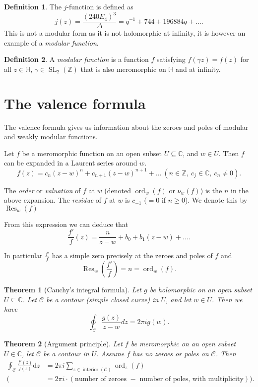 \documentclass{article}
\newtheorem*{thm}{Theorem}
\theoremstyle{definition}
\newtheorem*{defn}{Definition}
\DeclareMathOperator{\SL}{SL}
\DeclareMathOperator{\res}{Res}
\DeclareMathOperator{\ord}{ord}
\begin{document}
\begin{defn}
The $j$-function is defined as
\[j(z) = \frac{(240E_4)^3}{\Delta} = q^{-1} + 744 +196884q + \ldots.\]
This is not a modular form as it is not holomorphic at infinity, it is however an example of a \emph{modular function}.
\end{defn}

\begin{defn}
A \emph{modular function} is a function $f$ satisfying $f(\gamma z) = f(z)$ for all $z\in\mathbb{H}$, $\gamma\in\SL_2(\mathbb{Z})$ that is also meromorphic on $\mathbb{H}$ and at infinity.
\end{defn}

\section{The valence formula}

The valence formula gives us information about the zeroes and poles of modular and weakly modular functions.

Let $f$ be a meromorphic function on an open subset $U\subseteq\mathbb{C}$, and $w\in U$.
Then $f$ can be expanded in a Laurent series around $w$.
\[f(z) = c_n(z-w)^n + c_{n+1}(z-w)^{n+1} + \ldots\ (n\in\mathbb{Z},\ c_j\in\mathbb{C},\ c_n\ne 0).\]

The \emph{order} or \emph{valuation} of $f$ at $w$ (denoted $\ord_w(f)$ or $\nu_w(f)$) is the $n$ in the above expansion.
The \emph{residue} of $f$ at $w$ is $c_{-1}$ ($ = 0$ if $n\ge 0$).
We denote this by $\res_w(f)$

From this expression we can deduce that
\[\frac{f'}{f}(z) = \frac{n}{z-w} + b_0 + b_1(z-w) + \ldots.\]

In particular $\frac{f'}{f}$ has a simple zero precisely at the zeroes and poles of $f$ and
\[\res_w\left(\frac{f'}{f}\right) = n = \ord_w(f).\]

\begin{thm}[Cauchy's integral formula] Let $g$ be holomorphic on an open subset $U\subseteq\mathbb{C}$.
Let $\mathcal{C}$ be a contour (simple closed curve) in $U$, and let $w\in U$.
Then we have
\[\oint_{\mathcal{C}} \frac{g(z)}{z-w}dz = 2\pi i g(w).\]
\end{thm}

\begin{thm}[Argument principle] Let $f$ be meromorphic on an open subset $U\in\mathbb{C}$, let $\mathcal{C}$ be a contour in $U$.
Assume $f$ has no zeroes or poles on $\mathcal{C}$.
Then
\begin{align*}
\oint_{\mathcal{C}} \frac{f'(z)}{f(z)} \mathrm{d}z &= 2\pi i \sum_{z\in\operatorname{interior}(\mathcal{C})} \ord_z(f) \\
(&=2\pi i \cdot(\textrm{number of zeroes } - \textrm{ number of poles, with multiplicity})).\end{align*}
\end{thm}
\end{document}
